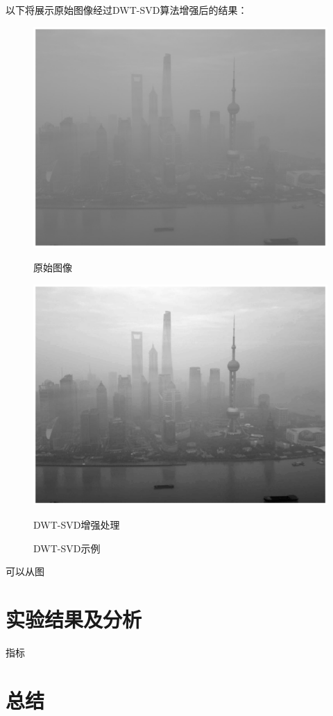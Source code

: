 \documentclass[12pt]{book}
\begin{document}
以下将展示原始图像经过DWT-SVD算法增强后的结果：
				\begin{figure}[ht]
					\begin{minipage}{0.48\linewidth}
						\centerline{\includegraphics[width=1\textwidth]{./figures/originalImage.eps}}
						\centerline{原始图像}
					\end{minipage}
					\qquad
					\begin{minipage}{0.48\linewidth}
						\centerline{\includegraphics[width=1\textwidth]{./figures/DWTSVDExample.eps}}
						\centerline{DWT-SVD增强处理}
					\end{minipage}
					\caption{DWT-SVD示例\label{DWT}}
				\end{figure}

可以从图






		
	\chapter{实验结果及分析}指标

	\chapter{总结}
\end{document}
